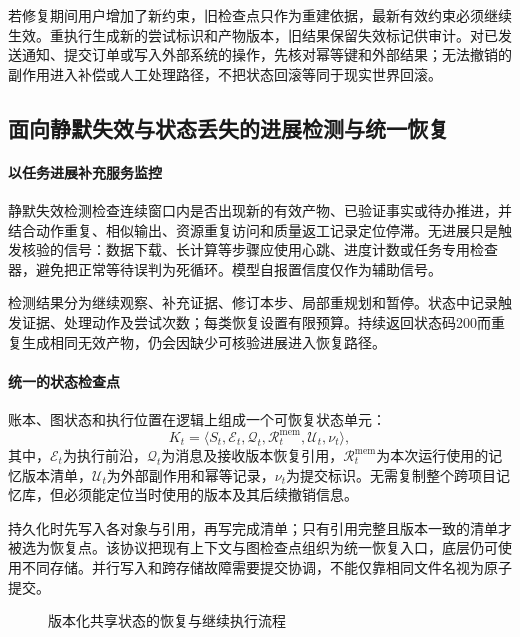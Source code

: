 若修复期间用户增加了新约束，旧检查点只作为重建依据，最新有效约束必须继续生效。重执行生成新的尝试标识和产物版本，旧结果保留失效标记供审计。对已发送通知、提交订单或写入外部系统的操作，先核对幂等键和外部结果；无法撤销的副作用进入补偿或人工处理路径，不把状态回滚等同于现实世界回滚。

\subsection{面向静默失效与状态丢失的进展检测与统一恢复}

\paragraph{以任务进展补充服务监控}
静默失效检测检查连续窗口内是否出现新的有效产物、已验证事实或待办推进，并结合动作重复、相似输出、资源重复访问和质量返工记录定位停滞。无进展只是触发核验的信号：数据下载、长计算等步骤应使用心跳、进度计数或任务专用检查器，避免把正常等待误判为死循环。模型自报置信度仅作为辅助信号。

检测结果分为继续观察、补充证据、修订本步、局部重规划和暂停。状态中记录触发证据、处理动作及尝试次数；每类恢复设置有限预算。持续返回状态码200而重复生成相同无效产物，仍会因缺少可核验进展进入恢复路径。

\paragraph{统一的状态检查点}
账本、图状态和执行位置在逻辑上组成一个可恢复状态单元：
\begin{equation}
K_t=\langle S_t,\mathcal{E}_t,\mathcal{Q}_t,
\mathcal{R}_t^{\mathrm{mem}},\mathcal{U}_t,\nu_t\rangle,
\end{equation}
其中，$\mathcal{E}_t$为执行前沿，$\mathcal{Q}_t$为消息及接收版本恢复引用，$\mathcal{R}_t^{\mathrm{mem}}$为本次运行使用的记忆版本清单，$\mathcal{U}_t$为外部副作用和幂等记录，$\nu_t$为提交标识。无需复制整个跨项目记忆库，但必须能定位当时使用的版本及其后续撤销信息。

持久化时先写入各对象与引用，再写完成清单；只有引用完整且版本一致的清单才被选为恢复点。该协议把现有上下文与图检查点组织为统一恢复入口，底层仍可使用不同存储。并行写入和跨存储故障需要提交协调，不能仅靠相同文件名视为原子提交。

\begin{figure}[htbp]
\centering
{}
\caption{版本化共享状态的恢复与继续执行流程}
\label{fig:anchor_recovery}
\end{figure}

